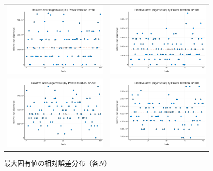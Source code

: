 \documentclass[a4paper,11pt]{ltjsarticle}
\begin{document}
\begin{figure}[H]
  \centering
  \begin{tabular}{cc}
    \includegraphics[width=72mm]{graphs/exp3_n50_relerr_eigenvalue.png} &
    \includegraphics[width=72mm]{graphs/exp3_n100_relerr_eigenvalue.png} \\
    \includegraphics[width=72mm]{graphs/exp3_n200_relerr_eigenvalue.png} &
    \includegraphics[width=72mm]{graphs/exp3_n400_relerr_eigenvalue.png} \\
  \end{tabular}
  \caption{最大固有値の相対誤差分布（各$N$）}
  \label{fig:exp3_relerr_lambda}
\end{figure}
\end{document}
